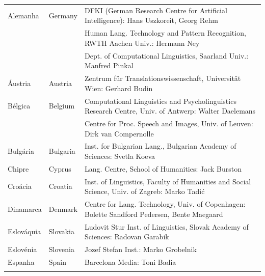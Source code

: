 \documentclass[]{../metanetpaper}
\begin{document}
\cleardoublepage

\appendix
{}



  
\cleardoublepage

\label{metanetmembers}

\small
\begin{longtable}{llp{105mm}}
  Alemanha & \textcolor{grey1}{Germany} & DFKI (German Research Centre for Artificial Intelligence): Hans Uszkoreit, Georg Rehm \\ \addlinespace
  & & Human Lang. Technology and Pattern Recognition, RWTH Aachen Univ.: Hermann Ney \\ \addlinespace
  & & Dept. of Computational Linguistics, Saarland Univ.: Manfred Pinkal \\ \addlinespace 
  Áustria & \textcolor{grey1}{Austria} & Zentrum für Translationswissenschaft, Universität Wien: Gerhard Budin \\ \addlinespace 
  Bélgica & \textcolor{grey1}{Belgium} & Computational Linguistics and Psycholinguistics Research Centre, Univ. of Antwerp: Walter Daelemans \\ \addlinespace
  & & Centre for Proc. Speech and Images, Univ. of Leuven: Dirk van Compernolle \\ \addlinespace
  Bulgária & \textcolor{grey1}{Bulgaria} & Inst. for Bulgarian Lang., Bulgarian Academy of Sciences: Svetla Koeva \\ \addlinespace
  Chipre & \textcolor{grey1}{Cyprus} & Lang. Centre, School of Humanities: Jack Burston \\ \addlinespace
  Croácia & \textcolor{grey1}{Croatia} & Inst. of Linguistics, Faculty of Humanities and Social Science, Univ. of Zagreb: Marko Tadić \\ \addlinespace
  Dinamarca &  \textcolor{grey1}{Denmark} & Centre for Lang. Technology, Univ. of Copenhagen: Bolette Sandford Pedersen, Bente Maegaard \\ \addlinespace
  Eslováquia & \textcolor{grey1}{Slovakia} & Ludovit Stur Inst. of Linguistics, Slovak Academy of Sciences: Radovan Garabik \\ \addlinespace 
  Eslovénia & \textcolor{grey1}{Slovenia} & Jozef Stefan Inst.: Marko Grobelnik \\ \addlinespace 
  Espanha & \textcolor{grey1}{Spain} & Barcelona Media: Toni Badia \\ \addlinespace 

\end{longtable}
\end{document}
